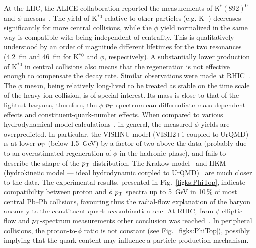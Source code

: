 At the LHC, the ALICE collaboration reported the measurements of K$^*(892)^0$ and $\phi$ mesons~\cite{Abelev:2014uua}. The yield of K$^{*0}$ relative to other particles (e.g. K$^-$) decreases significantly for more central collisions, while the $\phi$ yield normalized in the same way is compatible with being independent of centrality. This is qualitatively understood by an order of magnitude different lifetimes for the two resonances (4.2~fm and 46~fm for K$^{*0}$ and $\phi$, respectively). A substantially lower production of K$^{*0}$ in central collisions also means that the regeneration is not effective enough to compensate the decay rate. Similar observations were made at RHIC~\cite{Aggarwal:2010mt}. The $\phi$ meson, being relatively long-lived to be treated as stable on the time scale of the heavy-ion collision, is of special interest. Its mass is close to that of the lightest baryons, therefore, the $\phi$ $p_{\rm T}$ spectrum can differentiate mass-dependent effects and constituent-quark-number effects. When compared to various hydrodynamical-model calculations~\cite{Shen:2011eg,Qiu:2011hf,Bozek:2012qs,Song:2012tv,Song:2013qma,Karpenko:2011qn,Karpenko:2012yf}, in general, the measured $\phi$ yields are overpredicted. In particular, the VISHNU model (VISH2+1 coupled to UrQMD)~\cite{Song:2012tv,Song:2013qma} is at lower $p_{\rm T}$ (below 1.5~GeV) by a factor of two above the data (probably due to an overestimated regeneration of $\phi$ in the hadronic phase), and fails to describe the shape of the $p_{\rm T}$ distribution. The Krakow model~\cite{Bozek:2012qs} and HKM (hydrokinetic model --- ideal hydrodynamic coupled to UrQMD)~\cite{Karpenko:2011qn,Karpenko:2012yf} are much closer to the data. The experimental results, presented in Fig.~\ref{figks:PhiTop}, indicate compatibility between proton and  $\phi$ $p_{\rm T}$ spectra up to 5~GeV in 10\,\% of most central Pb--Pb collisions, favouring thus the radial-flow explanation of the baryon anomaly to the constituent-quark-recombination one. At RHIC, from $\phi$ elliptic-flow and $p_{\rm T}$-spectrum measurements other conclusion was reached~\cite{Abelev:2007rw}. In peripheral collisions, the proton-to-$\phi$  ratio is not constant (see Fig.~\ref{figks:PhiTop}), possibly implying that the quark content may influence a particle-production mechanism.

